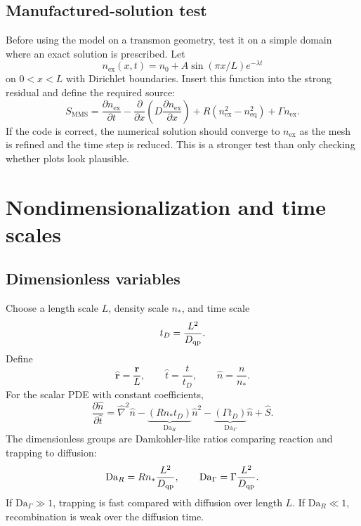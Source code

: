 \documentclass[11pt]{article}
\newcommand{\br}{{\bm{r}}}
\newcommand{\eq}{\mathrm{eq}}
\begin{document}
\subsection{Manufactured-solution test}
Before using the model on a transmon geometry, test it on a simple domain where an exact solution is prescribed. Let
\begin{equation}
n_{\mathrm{ex}}(x,t)=n_0+A\sin(\pi x/L)e^{-\lambda t}
\end{equation}
on $0<x<L$ with Dirichlet boundaries. Insert this function into the strong residual and define the required source:
\begin{equation}
S_{\mathrm{MMS}}=\frac{\partial n_{\mathrm{ex}}}{\partial t}
-\frac{\partial}{\partial x}\left(D\frac{\partial n_{\mathrm{ex}}}{\partial x}\right)
+R(n_{\mathrm{ex}}^2-n_{\eq}^2)+\Gamma n_{\mathrm{ex}}.
\end{equation}
If the code is correct, the numerical solution should converge to $n_{\mathrm{ex}}$ as the mesh is refined and the time step is reduced. This is a stronger test than only checking whether plots look plausible.

\section{Nondimensionalization and time scales}

\subsection{Dimensionless variables}
Choose a length scale $L$, density scale $n_*$, and time scale
\begin{equation}
 t_D=\frac{L^2}{D_{\mathrm{qp}}}.
\end{equation}
Define
\begin{equation}
\hat \br=\frac{\br}{L},\qquad \hat t=\frac{t}{t_D},\qquad \hat n=\frac{n}{n_*}.
\end{equation}
For the scalar PDE with constant coefficients,
\begin{equation}
\frac{\partial \hat n}{\partial \hat t}=\hat\nabla^2\hat n
-\underbrace{(R n_* t_D)}_{\mathrm{Da}_R}\hat n^2
-\underbrace{(\Gamma t_D)}_{\mathrm{Da}_\Gamma}\hat n
+\hat S.
\end{equation}
The dimensionless groups are Damkohler-like ratios comparing reaction and trapping to diffusion:
\begin{equation}
\mathrm{Da}_R=R n_*\frac{L^2}{D_{\mathrm{qp}}},
\qquad
\mathrm{Da}_\Gamma=\Gamma\frac{L^2}{D_{\mathrm{qp}}}.
\end{equation}
If $\mathrm{Da}_\Gamma\gg1$, trapping is fast compared with diffusion over length $L$. If $\mathrm{Da}_R\ll1$, recombination is weak over the diffusion time.
\end{document}
